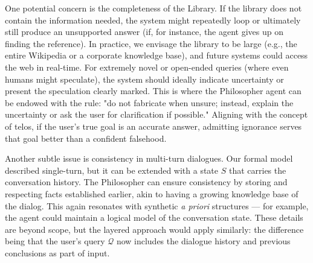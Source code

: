 \documentclass{article}
\begin{document}
One potential concern is the completeness of the Library. If the library does not contain the information needed, the system might repeatedly loop or ultimately still produce an unsupported answer (if, for instance, the agent gives up on finding the reference). In practice, we envisage the library to be large (e.g., the entire Wikipedia or a corporate knowledge base), and future systems could access the web in real-time. For extremely novel or open-ended queries (where even humans might speculate), the system should ideally indicate uncertainty or present the speculation clearly marked. This is where the Philosopher agent can be endowed with the rule: "do not fabricate when unsure; instead, explain the uncertainty or ask the user for clarification if possible." Aligning with the concept of telos, if the user's true goal is an accurate answer, admitting ignorance serves that goal better than a confident falsehood.

Another subtle issue is consistency in multi-turn dialogues. Our formal model described single-turn, but it can be extended with a state $S$ that carries the conversation history. The Philosopher can ensure consistency by storing and respecting facts established earlier, akin to having a growing knowledge base of the dialog. This again resonates with synthetic \emph{a priori} structures — for example, the agent could maintain a logical model of the conversation state. These details are beyond scope, but the layered approach would apply similarly: the difference being that the user's query $\mathcal{Q}$ now includes the dialogue history and previous conclusions as part of input.
\end{document}
